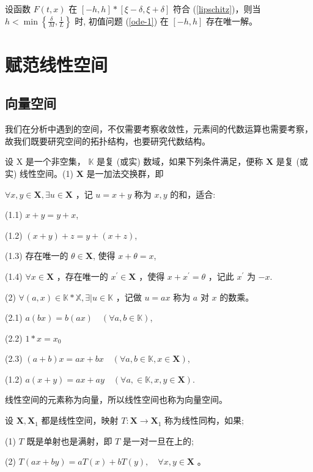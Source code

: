 \begin{theorem}
    设函数 $F(t, x)$ 在 $[-h, h] *[\xi-\delta, \xi+\delta]$ 符合 (\ref{lipschitz})，则当 $h<\min \left\{\frac{\delta}{M}, \frac{1}{L}\right\}$ 时, 初值问题 (\ref{ode-1}) 在 $[-h, h]$ 存在唯一解。
\end{theorem}

\section{赋范线性空间}
\subsection{向量空间}
我们在分析中遇到的空间，不仅需要考察收敛性，元素间的代数运算也需要考察，故我们既要研究空间的拓扑结构，也要研究代数结构。
\begin{definition}
    设 $\mathrm{X}$ 是一个非空集， $\mathbb{K}$ 是复 (或实) 数域，如果下列条件满足，便称 $\mathbf{X}$ 是复 (或实) 线性空间。(1) $\mathbf{X}$ 是一加法交换群，即
    
    $\forall x, y \in \mathbf{X}, \exists u \in \mathbf{X}$ ，记 $u=x+y$ 称为 $x, y$ 的和，适合:
    
    (1.1) $x+y=y+x$,
    
    (1.2) $(x+y)+z=y+(x+z)$,
    
    (1.3) 存在唯一的 $\theta \in \mathbf{X}$, 使得 $x+\theta=x$,

    (1.4) $\forall x \in \mathbf{X}$ ，存在唯一的 $x^{\prime} \in \mathbf{X}$ ，使得 $x+x^{\prime}=\theta$ ，记此 $x^{\prime}$ 为 $-x$.
    
    (2) $\forall(a, x) \in \mathbb{K} * \mathbb{X}, \exists \mid u \in \mathbb{K}$ ，记做 $u=a x$ 称为 $a$ 对 $x$ 的数乘。
    
    (2.1) $a(b x)=b(a x) \quad(\forall a, b \in \mathbb{K})$,
    
    (2.2) $1 * x=x_0$

    (2.3) $(a+b) x=a x+b x \quad(\forall a, b \in \mathbb{K}, x \in \mathbf{X})$,
    
    (1.2) $a(x+y)=a x+a y \quad(\forall a, \in \mathbb{K}, x, y \in \mathbf{X})$.

    线性空间的元素称为向量，所以线性空间也称为向量空间。
\end{definition}

\begin{definition}
    设 $\mathbf{X}, \mathbf{X}_1$ 都是线性空间，映射 $T: \mathbf{X} \rightarrow \mathbf{X}_1$ 称为线性同构，如果;

    (1) $T$ 既是单射也是满射，即 $T$ 是一对一旦在上的;

    (2) $T(a x+b y)=a T(x)+b T(y), \quad \forall x, y \in \mathbf{X}$ 。
\end{definition}

